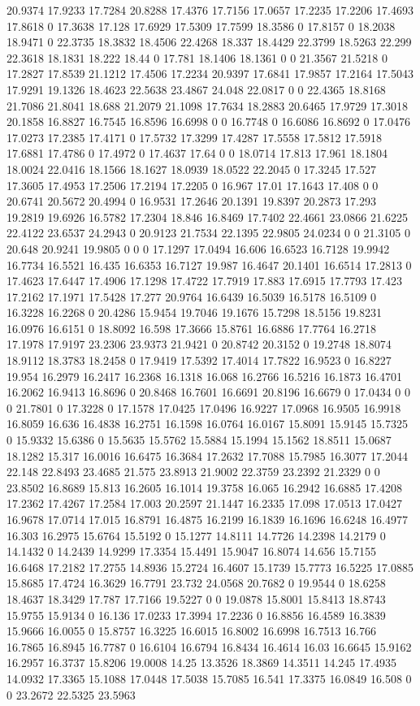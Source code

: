 20.9374 17.9233 17.7284 20.8288 17.4376 17.7156 17.0657 17.2235 17.2206 17.4693 17.8618 0 17.3638 17.128 17.6929 17.5309 17.7599 18.3586 0 17.8157 0 18.2038 18.9471 0 22.3735 18.3832 18.4506 22.4268 18.337 18.4429 22.3799 18.5263 22.299 22.3618 18.1831 18.222 18.44 0 17.781 18.1406 18.1361 0 0 21.3567 21.5218 0 17.2827 17.8539 21.1212 17.4506 17.2234 20.9397 17.6841 17.9857 17.2164 17.5043 17.9291 19.1326 18.4623 22.5638 23.4867 24.048 22.0817 0 0 22.4365 18.8168 21.7086 21.8041 18.688 21.2079 21.1098 17.7634 18.2883 20.6465 17.9729 17.3018 20.1858 16.8827 16.7545 16.8596 16.6998 0 0 16.7748 0 16.6086 16.8692 0 17.0476 17.0273 17.2385 17.4171 0 17.5732 17.3299 17.4287 17.5558 17.5812 17.5918 17.6881 17.4786 0 17.4972 0 17.4637 17.64 0 0 18.0714 17.813 17.961 18.1804 18.0024 22.0416 18.1566 18.1627 18.0939 18.0522 22.2045 0 17.3245 17.527 17.3605 17.4953 17.2506 17.2194 17.2205 0 16.967 17.01 17.1643 17.408 0 0 20.6741 20.5672 20.4994 0 16.9531 17.2646 20.1391 19.8397 20.2873 17.293 19.2819 19.6926 16.5782 17.2304 18.846 16.8469 17.7402 22.4661 23.0866 21.6225 22.4122 23.6537 24.2943 0 20.9123 21.7534 22.1395 22.9805 24.0234 0 0 21.3105 0 20.648 20.9241 19.9805 0 0 0 17.1297 17.0494 16.606 16.6523 16.7128 19.9942 16.7734 16.5521 16.435 16.6353 16.7127 19.987 16.4647 20.1401 16.6514 17.2813 0 17.4623 17.6447 17.4906 17.1298 17.4722 17.7919 17.883 17.6915 17.7793 17.423 17.2162 17.1971 17.5428 17.277 20.9764 16.6439 16.5039 16.5178 16.5109 0 16.3228 16.2268 0 20.4286 15.9454 19.7046 19.1676 15.7298 18.5156 19.8231 16.0976 16.6151 0 18.8092 16.598 17.3666 15.8761 16.6886 17.7764 16.2718 17.1978 17.9197 23.2306 23.9373 21.9421 0 20.8742 20.3152 0 19.2748 18.8074 18.9112 18.3783 18.2458 0 17.9419 17.5392 17.4014 17.7822 16.9523 0 16.8227 19.954 16.2979 16.2417 16.2368 16.1318 16.068 16.2766 16.5216 16.1873 16.4701 16.2062 16.9413 16.8696 0 20.8468 16.7601 16.6691 20.8196 16.6679 0 17.0434 0 0 0 21.7801 0 17.3228 0 17.1578 17.0425 17.0496 16.9227 17.0968 16.9505 16.9918 16.8059 16.636 16.4838 16.2751 16.1598 16.0764 16.0167 15.8091 15.9145 15.7325 0 15.9332 15.6386 0 15.5635 15.5762 15.5884 15.1994 15.1562 18.8511 15.0687 18.1282 15.317 16.0016 16.6475 16.3684 17.2632 17.7088 15.7985 16.3077 17.2044 22.148 22.8493 23.4685 21.575 23.8913 21.9002 22.3759 23.2392 21.2329 0 0 23.8502 16.8689 15.813 16.2605 16.1014 19.3758 16.065 16.2942 16.6885 17.4208 17.2362 17.4267 17.2584 17.003 20.2597 21.1447 16.2335 17.098 17.0513 17.0427 16.9678 17.0714 17.015 16.8791 16.4875 16.2199 16.1839 16.1696 16.6248 16.4977 16.303 16.2975 15.6764 15.5192 0 15.1277 14.8111 14.7726 14.2398 14.2179 0 14.1432 0 14.2439 14.9299 17.3354 15.4491 15.9047 16.8074 14.656 15.7155 16.6468 17.2182 17.2755 14.8936 15.2724 16.4607 15.1739 15.7773 16.5225 17.0885 15.8685 17.4724 16.3629 16.7791 23.732 24.0568 20.7682 0 19.9544 0 18.6258 18.4637 18.3429 17.787 17.7166 19.5227 0 0 19.0878 15.8001 15.8413 18.8743 15.9755 15.9134 0 16.136 17.0233 17.3994 17.2236 0 16.8856 16.4589 16.3839 15.9666 16.0055 0 15.8757 16.3225 16.6015 16.8002 16.6998 16.7513 16.766 16.7865 16.8945 16.7787 0 16.6104 16.6794 16.8434 16.4614 16.03 16.6645 15.9162 16.2957 16.3737 15.8206 19.0008 14.25 13.3526 18.3869 14.3511 14.245 17.4935 14.0932 17.3365 15.1088 17.0448 17.5038 15.7085 16.541 17.3375 16.0849 16.508 0 0 23.2672 22.5325 23.5963 